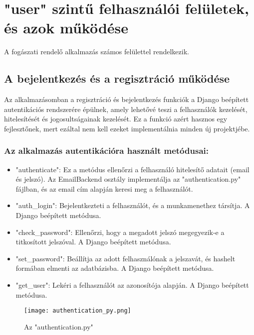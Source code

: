 \chapter{"user" szintű felhasználói felületek, és azok működése}
\label{chap:fejezet5}

A fogászati rendelő alkalmazás számos felülettel rendelkezik.

\section{A bejelentkezés és a regisztráció működése}

Az alkalmazásomban a regisztráció és bejelentkezés funkciók a Django beépített autentikációs rendszerére épülnek, amely lehetővé teszi a felhasználók kezelését, hitelesítését és jogosultságainak kezelését. Ez a funkció azért hasznos egy fejlesztőnek, mert ezáltal nem kell ezeket implementálnia minden új projektjébe.

\subsection{Az alkalmazás autentikációra használt metódusai:}

\begin{itemize}
	\item "authenticate": Ez a metódus ellenőrzi a felhasználó hitelesítő adatait (email és jelszó). Az EmailBackend osztály implementálja az "authentication.py" fájlban, és az email cím alapján keresi meg a felhasználót.
	\item "auth\_login": Bejelentkezteti a felhasználót, és a munkamenethez társítja. A Django beépített metódusa.
	\item "check\_password": Ellenőrzi, hogy a megadott jelszó megegyezik-e a titkosított jelszóval. A Django beépített metódusa.
	\item "set\_password": Beállítja az adott felhasználónak a jelszavát, és hashelt formában elmenti az adatbázisba. A Django beépített metódusa.
	\item "get\_user": Lekéri a felhasználót az azonosítója alapján. A Django beépített metódusa.
\end{itemize}

\begin{figure}[H]
	\caption{Az "authentication.py"}
	\label{fig:authentication}
	\centering
	\texttt{[image: authentication\_py.png]}
\end{figure}

